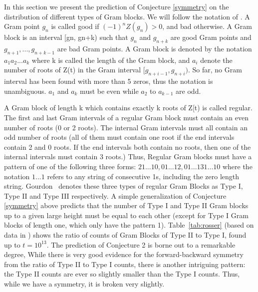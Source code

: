 \documentclass[twoside]{article}
\begin{document}
In this section we present the prediction of  Conjecture \ref{symmetry} on the distribution of different types of Gram blocks. We will follow the notation of  \cite{gourdon}.
A Gram point $g_n$ is called good if $(-1)^nZ(g_n) > 0$, and bad otherwise. A Gram block is an interval [gn, gn+k) such that $g_n$  and $g_{n+k}$ are good Gram points 
and $g_{n+1}, . . ., g_{n+k-1}$ are bad Gram points. A Gram block is denoted by the notation $a_1a_2 . . . a_k$ where k is called the length of the Gram block, and $a_i$ denote the number of roots of Z(t) in the Gram interval $[g_{n+i-1}, g_{n+i})$. So far, no Gram interval has been found with more than 5 zeros, thus the notation is unambiguous. $a_1$ and $a_k$ must be even while  $a_2$ to $a_{k-1}$ are odd.

A Gram block of length k which contains exactly k roots of Z[t) is called regular. The first and last Gram intervals of a regular Gram block must contain an even number of roots (0 or 2 roots). The internal Gram intervals must all contain an odd number of roots (all of them must contain one root if the end intervals contain 2 and 0 roots. If the end intervals both contain no roots, then one of the internal intervals must contain 3 roots.) 
Thus, Regular Gram blocks must have a pattern of one of the following three forms:
$21 . . . 10, 01 . . . 12, 01 . . . 131 . . . 10$
where the notation $1 . . . 1$ refers to any string of consecutive 1s, including the zero length string. Gourdon~\cite{gourdon} denotes these three types of regular Gram Blocks as Type I, Type II and Type III respectively. A simple generalization of Conjecture \ref{symmetry} above predicts that the number of Type I and Type II Gram blocks up to a given large height must be equal to each other (except for Type I Gram blocks of length one, which only have the pattern 1).  Table~\ref{tab:rosser}  (based on data in \cite{gourdon}) shows the ratio of counts of Gram Blocks of Type II to Type I, found up to $t = 10^{13}$. The prediction of Conjecture 2 is borne out to a remarkable degree, While there is very good evidence for the forward-backward symmetry from the ratio of Type II to Type I counts, there is another intriguing pattern: the Type II counts are ever so slightly smaller than the Type I counts. Thus, while we have a symmetry, it is broken very slightly.
\end{document}
